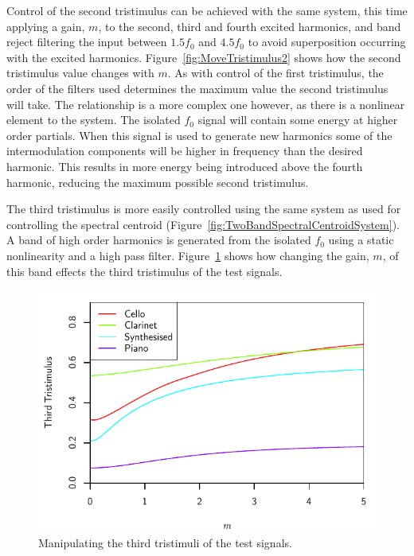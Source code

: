 		Control of the second tristimulus can be achieved with the same system, this time applying a gain, $m$, to
		the second, third and fourth excited harmonics, and band reject filtering the input between $1.5f_{0}$ and
		$4.5f_{0}$ to avoid superposition occurring with the excited harmonics.  Figure~\ref{fig:MoveTristimulus2}
		shows how the second tristimulus value changes with $m$. As with control of the first tristimulus, the
		order of the filters used determines the maximum value the second tristimulus will take. The relationship
		is a more complex one however, as there is a nonlinear element to the system.  The isolated $f_{0}$ signal
		will contain some energy at higher order partials.  When this signal is used to generate new harmonics some
		of the intermodulation components will be higher in frequency than the desired harmonic. This results in
		more energy being introduced above the fourth harmonic, reducing the maximum possible second tristimulus.

		The third tristimulus is more easily controlled using the same system as used for controlling the spectral
		centroid (Figure~\ref{fig:TwoBandSpectralCentroidSystem}). A band of high order harmonics is generated from
		the isolated $f_{0}$ using a static nonlinearity and a high pass filter.  Figure~\ref{fig:MoveTristimulus3}
		shows how changing the gain, $m$, of this band effects the third tristimulus of the test signals.

		\begin{figure}[h!]
			\centering
			\includegraphics{chapter6/Images/MoveTristimulus3.pdf}
			\caption{Manipulating the third tristimuli of the test signals.}
			\label{fig:MoveTristimulus3}
		\end{figure}

